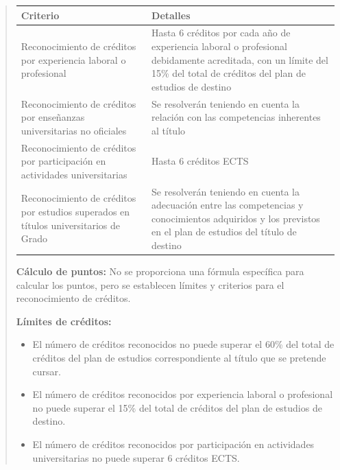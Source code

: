 \documentclass[12pt,a4paper,oneside]{report}
\begin{document}
\begin{itemize}
\begin{itemize}
\begin{quote}
\begin{tabular}{p{3.5cm} p{8cm}}
\toprule
\textbf{Criterio} & \textbf{Detalles} \\
\midrule
Reconocimiento de créditos por experiencia laboral o profesional & Hasta 6 créditos por cada año de experiencia laboral o profesional debidamente acreditada, con un límite del 15\% del total de créditos del plan de estudios de destino \\
Reconocimiento de créditos por enseñanzas universitarias no oficiales & Se resolverán teniendo en cuenta la relación con las competencias inherentes al título \\
Reconocimiento de créditos por participación en actividades universitarias & Hasta 6 créditos ECTS \\
Reconocimiento de créditos por estudios superados en títulos universitarios de Grado & Se resolverán teniendo en cuenta la adecuación entre las competencias y conocimientos adquiridos y los previstos en el plan de estudios del título de destino \\
\bottomrule
\end{tabular}


\textbf{Cálculo de puntos:}
No se proporciona una fórmula específica para calcular los puntos, pero se establecen límites y criterios para el reconocimiento de créditos.

\textbf{Límites de créditos:}
\begin{itemize}
  \item El número de créditos reconocidos no puede superar el 60\% del total de créditos del plan de estudios correspondiente al título que se pretende cursar.
  \item El número de créditos reconocidos por experiencia laboral o profesional no puede superar el 15\% del total de créditos del plan de estudios de destino.
  \item El número de créditos reconocidos por participación en actividades universitarias no puede superar 6 créditos ECTS.
\end{itemize}


\end{quote}
\end{itemize}
\end{itemize}
\end{document}
